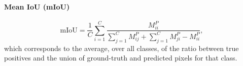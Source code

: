 \paragraph{Mean IoU (mIoU)}
\begin{equation}
\mathrm{mIoU} = \frac{1}{C} \sum_{i=1}^{C} \frac{M^{P}_{ii}}{\sum_{j=1}^{C} M^{P}_{ij} + \sum_{j=1}^{C} M^{P}_{ji} - M^{P}_{ii}},
\end{equation}
which corresponds to the average, over all classes, of the ratio between true positives and the union of ground-truth and predicted pixels for that class.






